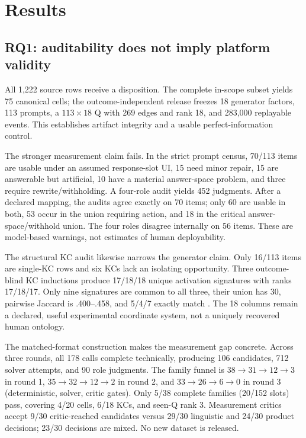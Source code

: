 \section{Results}
\label{sec:results}

\subsection{RQ1: auditability does not imply platform validity}



All 1,222 source rows receive a disposition.  The complete in-scope subset
yields 75 canonical cells; the outcome-independent release freezes 18 generator
factors, 113 prompts, a $113\times18$ Q with 269 edges and rank 18, and 283,000
replayable events.  This establishes artifact integrity and a usable
perfect-information control.

The stronger measurement claim fails.  In the strict prompt census, 70/113
items are usable under an assumed response-slot UI, 15 need minor repair, 15 are
answerable but artificial, 10 have a material answer-space problem, and three
require rewrite/withholding.  A four-role audit yields 452 judgments.  After a
declared mapping, the audits agree exactly on 70 items; only 60 are usable in
both, 53 occur in the union requiring action, and 18 in the critical
answer-space/withhold union.  The four roles disagree internally on 56 items.
These are model-based warnings, not estimates of human deployability.

The structural KC audit likewise narrows the generator claim.  Only 16/113
items are single-KC rows and six KCs lack an isolating opportunity.  Three
outcome-blind KC inductions produce 17/18/18 unique activation signatures with
ranks 17/18/17.  Only nine signatures are common to all three, their union has
30, pairwise Jaccard is .400--.458, and 5/4/7 exactly match \kstar{}.  The
18 columns remain a declared, useful experimental coordinate system, not a
uniquely recovered human ontology.

The matched-format construction makes the measurement gap concrete.  Across
three rounds, all 178 calls complete technically, producing 106 candidates,
712 solver attempts, and 90 role judgments.  The family funnel is
$38\rightarrow31\rightarrow12\rightarrow3$ in round 1,
$35\rightarrow32\rightarrow12\rightarrow2$ in round 2, and
$33\rightarrow26\rightarrow6\rightarrow0$ in round 3 (deterministic,
solver, critic gates).  Only 5/38 complete families (20/152 slots) pass,
covering 4/20 cells, 6/18 KCs, and seen-Q rank 3.  Measurement critics accept
9/30 critic-reached candidates versus 29/30 linguistic and 24/30 product
decisions; 23/30 decisions are mixed.  No new dataset is released.

